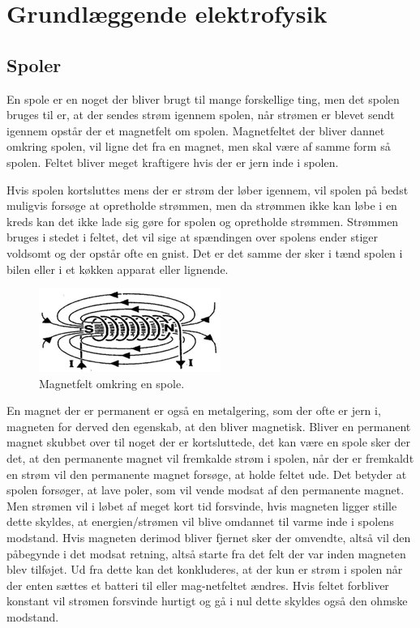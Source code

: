 \section{Grundlæggende elektrofysik}

\subsection{Spoler}

En spole er en noget der bliver brugt til mange forskellige ting, men det spolen bruges til er, at der sendes strøm igennem spolen, når strømen er blevet sendt igennem opstår der et magnetfelt om spolen. Magnetfeltet der bliver dannet omkring spolen, vil ligne det fra en magnet, men skal være af samme form så spolen. Feltet bliver meget kraftigere hvis der er jern inde i spolen. 

Hvis spolen kortsluttes mens der er strøm der løber igennem, vil spolen på bedst muligvis forsøge at opretholde strømmen, men da strømmen ikke kan løbe i en kreds kan det ikke lade sig gøre for spolen og opretholde strømmen.  Strømmen bruges i stedet i feltet, det vil sige at spændingen over spolens ender stiger voldsomt og der opstår ofte en gnist. Det er det samme der sker i tænd spolen i bilen eller i et køkken apparat eller lignende.

\begin{figure}[htbp]
	\centering
	\includegraphics[width=0.5
	\textwidth]{Vildledning/Schematics/magnetfelt_omkring_en_spole.png}
	\caption{Magnetfelt omkring en spole.\cite{spoler}}
	\label{spole1}
\end{figure}

En magnet der er permanent er også en metalgering, som der ofte er jern i, magneten for derved den egenskab, at den bliver magnetisk.  Bliver en permanent magnet skubbet over til noget der er kortsluttede, det kan være en spole sker der det, at den permanente magnet vil fremkalde strøm i spolen, når der er fremkaldt en strøm vil den permanente magnet forsøge, at holde feltet ude. Det betyder at spolen forsøger, at lave poler, som vil vende modsat af den permanente magnet. Men strømen vil i løbet af meget kort tid forsvinde, hvis magneten ligger stille dette skyldes, at energien/strømen vil blive omdannet til varme inde i spolens modstand. Hvis magneten derimod bliver fjernet sker der omvendte, altså vil den påbegynde i det modsat retning, altså starte fra det felt der var inden magneten blev tilføjet. Ud fra dette kan det konkluderes, at der kun er strøm i spolen når der enten sættes et batteri til eller mag-netfeltet ændres. Hvis feltet forbliver konstant vil strømen forsvinde hurtigt og gå i nul dette skyldes også den ohmske modstand. 

